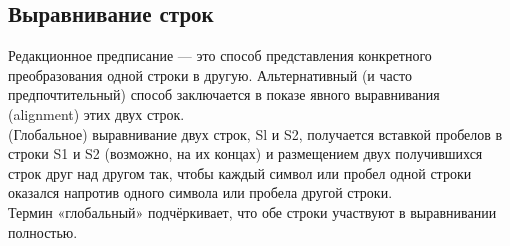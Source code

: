 \documentclass[a4paper,12pt]{article}
\begin{document}
\subsection{Выравнивание строк}
Редакционное предписание — это способ представления конкретного преобразования одной строки в другую. Альтернативный (и часто предпочтительный) способ заключается в показе явного выравнивания (alignment) этих двух строк.\\
(Глобальное) выравнивание двух строк, Sl и S2, получается вставкой пробелов в строки S1 и S2 (возможно, на их концах) и размещением двух получившихся строк друг над другом так, чтобы каждый символ или пробел одной строки оказался напротив одного символа или пробела другой строки.\\
Термин «глобальный» подчёркивает, что обе строки участвуют в выравнивании полностью.\cite{gasfild}
\end{document}
